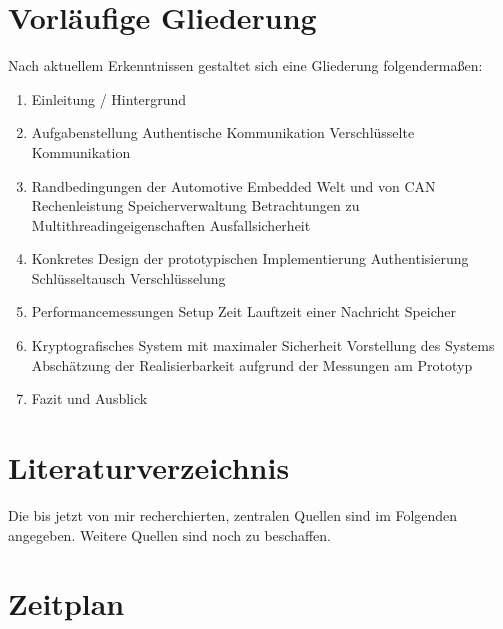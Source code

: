 \section{Vorläufige Gliederung}
Nach aktuellem Erkenntnissen gestaltet sich eine Gliederung folgendermaßen:
\begin{enumerate}
	\item Einleitung / Hintergrund

	\item  Aufgabenstellung
	\subitem   Authentische Kommunikation
	\subitem  Verschlüsselte Kommunikation
	
	\item  Randbedingungen der Automotive Embedded Welt und von CAN
	\subitem  Rechenleistung 
	\subitem  Speicherverwaltung
	\subitem  Betrachtungen zu Multithreadingeigenschaften
	\subitem  Ausfallsicherheit

	\item  Konkretes Design der prototypischen Implementierung
	\subitem  Authentisierung
	\subitem  Schlüsseltausch
	\subitem  Verschlüsselung 

	\item Performancemessungen
	\subitem  Setup Zeit
	\subitem  Lauftzeit einer Nachricht
	\subitem  Speicher
	
	\item Kryptografisches System mit maximaler Sicherheit
	\subitem Vorstellung des Systems
	\subitem Abschätzung der Realisierbarkeit aufgrund der Messungen am Prototyp
	\item  Fazit und Ausblick

	\end{enumerate}


\section{Literaturverzeichnis}
Die bis jetzt von mir recherchierten,  zentralen Quellen sind im Folgenden angegeben. Weitere Quellen sind noch zu beschaffen. 
\nocite{*}



\section{Zeitplan}


